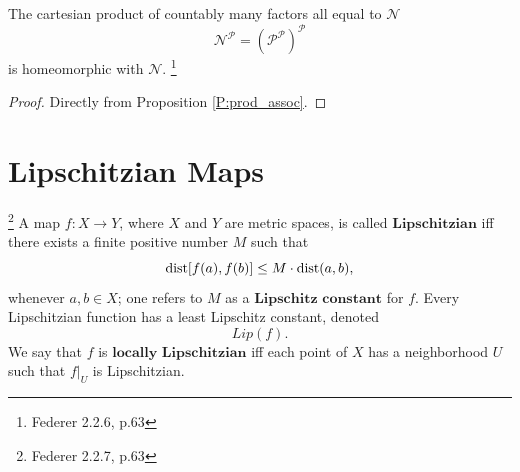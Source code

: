 \begin{lemma} \label{L:prod_baire}
The cartesian product of countably many factors all equal to $\mathcal{N}$ 
\[
  \mathcal{N}^{\mathcal{P}} = (\mathcal{P}^{\mathcal{P}})^{\mathcal{P}}
\]
is homeomorphic with $\mathcal{N}$.
\footnote{Federer 2.2.6, p.63}
\end{lemma}
\begin{proof}
Directly from Proposition \ref{P:prod_assoc}.
% 
% 
% 
% 

\end{proof}



\section{Lipschitzian Maps}

\begin{definition} \label{D:lipschitz}
\footnote{Federer 2.2.7, p.63}
A map $f:X\to Y$, where $X$ and $Y$ are metric spaces, is called
$\textbf{Lipschitzian}$ 
iff there exists a finite positive number $M$ such that
\[
  \operatorname*{dist}[f(a),f(b)] \leq M \cdot \operatorname*{dist}(a,b),
\]
whenever $a,b\in X$; one refers to $M$ as a $\textbf{Lipschitz constant}$ for
$f$. Every Lipschitzian function has a least Lipschitz constant, denoted
\[
  Lip(f).
\]
We say that $f$ is $\textbf{locally Lipschitzian}$
iff each point of $X$ has a
neighborhood $U$ such that $f|_U$ is Lipschitzian.
\end{definition}

